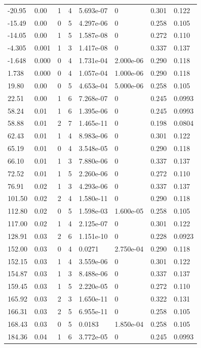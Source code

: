 \documentclass[preview]{standalone}
\begin{document}
{{\begin{tabular}{L{1.2cm}C{1.2cm} C{0.3cm}C{0.5cm} C{1.4cm}C{1.4cm} C{1.4cm}C{1.4cm}}
  -20.95  &  0.00  & 1     &  4 &  5.693e-07  & 0  & 0.301 &  0.122   \\ 
  -15.49  &  0.00  & 0     &  5 &  4.297e-06  & 0  & 0.258 &  0.105   \\ 
  -14.05  &  0.00  & 1     &  5 &  1.587e-08  & 0  & 0.272 &  0.110   \\ 
  -4.305  &  0.001  & 1     &  3 &  1.417e-08  & 0  & 0.337 &  0.137   \\ 
  -1.648  &  0.000  & 0     &  4 &  1.731e-04  & 2.000e-06  & 0.290 &  0.118   \\ 
  1.738  &  0.000  & 0     &  4 &  1.057e-04  & 1.000e-06  & 0.290 &  0.118   \\ 
  19.80  &  0.00  & 0     &  5 &  4.653e-04  & 5.000e-06  & 0.258 &  0.105   \\ 
  22.51  &  0.00  & 1     &  6 &  7.268e-07  & 0  & 0.245 &  0.0993   \\ 
  58.24  &  0.01  & 1     &  6 &  1.395e-06  & 0  & 0.245 &  0.0993   \\ 
  58.88  &  0.01  & 2     &  7 &  1.465e-11  & 0  & 0.198 &  0.0804   \\ 
  62.43  &  0.01  & 1     &  4 &  8.983e-06  & 0  & 0.301 &  0.122   \\ 
  65.19  &  0.01  & 0     &  4 &  3.548e-05  & 0  & 0.290 &  0.118   \\ 
  66.10  &  0.01  & 1     &  3 &  7.880e-06  & 0  & 0.337 &  0.137   \\ 
  72.52  &  0.01  & 1     &  5 &  2.260e-06  & 0  & 0.272 &  0.110   \\ 
  76.91  &  0.02  & 1     &  3 &  4.293e-06  & 0  & 0.337 &  0.137   \\ 
  101.50  &  0.02  & 2     &  4 &  1.580e-11  & 0  & 0.290 &  0.118   \\ 
  112.80  &  0.02  & 0     &  5 &  1.598e-03  & 1.600e-05  & 0.258 &  0.105   \\ 
  117.00  &  0.02  & 1     &  4 &  2.125e-07  & 0  & 0.301 &  0.122   \\ 
  128.91  &  0.03  & 2     &  6 &  1.151e-10  & 0  & 0.228 &  0.0923   \\ 
  152.00  &  0.03  & 0     &  4 &  0.0271  & 2.750e-04  & 0.290 &  0.118   \\ 
  152.15  &  0.03  & 1     &  4 &  3.559e-06  & 0  & 0.301 &  0.122   \\ 
  154.87  &  0.03  & 1     &  3 &  8.488e-06  & 0  & 0.337 &  0.137   \\ 
  159.45  &  0.03  & 1     &  5 &  2.220e-05  & 0  & 0.272 &  0.110   \\ 
  165.92  &  0.03  & 2     &  3 &  1.650e-11  & 0  & 0.322 &  0.131   \\ 
  166.31  &  0.03  & 2     &  5 &  6.955e-11  & 0  & 0.258 &  0.105   \\ 
  168.43  &  0.03  & 0     &  5 &  0.0183  & 1.850e-04  & 0.258 &  0.105   \\ 
  184.36  &  0.04  & 1     &  6 &  3.772e-05  & 0  & 0.245 &  0.0993   \\ 
\hline 
\end{tabular} 

}}
\end{document}
